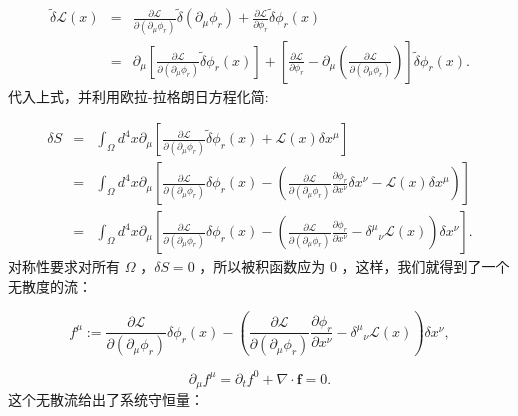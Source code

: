 \documentclass[10pt,UTF8]{ctexart}
\begin{document}
\begin{eqnarray*}
\tilde{\delta}\mathcal{L}\left(x\right) & = & \frac{\partial\mathcal{L}}{\partial\left(\partial_{\mu}\phi_{r}\right)}\tilde{\delta}\left(\partial_{\mu}\phi_{r}\right)+\frac{\partial\mathcal{L}}{\partial\phi_{r}}\tilde{\delta}\phi_{r}\left(x\right)\\
 & = & \partial_{\mu}\left[\frac{\partial\mathcal{L}}{\partial\left(\partial_{\mu}\phi_{r}\right)}\tilde{\delta}\phi_{r}\left(x\right)\right]+\left[\frac{\partial\mathcal{L}}{\partial\phi_{r}}-\partial_{\mu}\left(\frac{\partial\mathcal{L}}{\partial\left(\partial_{\mu}\phi_{r}\right)}\right)\right]\tilde{\delta}\phi_{r}\left(x\right).
\end{eqnarray*}
代入上式，并利用欧拉-拉格朗日方程化简: 

\begin{eqnarray}
\delta S & = & \int_{\Omega}d^{4}x\partial_{\mu}\left[\frac{\partial\mathcal{L}}{\partial\left(\partial_{\mu}\phi_{r}\right)}\tilde{\delta}\phi_{r}\left(x\right)+\mathcal{L}\left(x\right)\delta x^{\mu}\right]\nonumber \\
 & = & \int_{\Omega}d^{4}x\partial_{\mu}\left[\frac{\partial\mathcal{L}}{\partial\left(\partial_{\mu}\phi_{r}\right)}\delta\phi_{r}\left(x\right)-\left(\frac{\partial\mathcal{L}}{\partial\left(\partial_{\mu}\phi_{r}\right)}\frac{\partial\phi_{r}}{\partial x^{\nu}}\delta x^{\nu}-\mathcal{L}\left(x\right)\delta x^{\mu}\right)\right]\nonumber \\
 & = & \int_{\Omega}d^{4}x\partial_{\mu}\left[\frac{\partial\mathcal{L}}{\partial\left(\partial_{\mu}\phi_{r}\right)}\delta\phi_{r}\left(x\right)-\left(\frac{\partial\mathcal{L}}{\partial\left(\partial_{\mu}\phi_{r}\right)}\frac{\partial\phi_{r}}{\partial x^{\nu}}-{\delta^{\mu}}_{\nu}\mathcal{L}\left(x\right)\right)\delta x^{\nu}\right].
\end{eqnarray}
对称性要求对所有 $\Omega$ ，$\delta S=0$ ，所以被积函数应为 0 ，这样，我们就得到了一个无散度的流： 

\begin{equation}
f^{\mu}:=\frac{\partial\mathcal{L}}{\partial\left(\partial_{\mu}\phi_{r}\right)}\delta\phi_{r}\left(x\right)-\left(\frac{\partial\mathcal{L}}{\partial\left(\partial_{\mu}\phi_{r}\right)}\frac{\partial\phi_{r}}{\partial x^{\nu}}-{\delta^{\mu}}_{\nu}\mathcal{L}\left(x\right)\right)\delta x^{\nu},
\end{equation}

\begin{equation}
\partial_{\mu}f^{\mu}=\partial_{t}f^{0}+\nabla\cdot\mathbf{f}=0.
\end{equation}
这个无散流给出了系统守恒量： 
\end{document}
